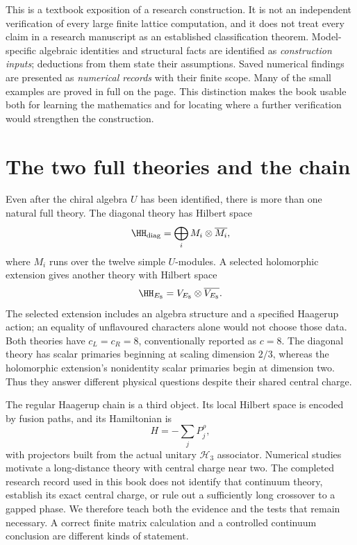 This is a textbook exposition of a research construction. It is not an
independent verification of every large finite lattice computation,
and it does not treat every claim in a research manuscript as an
established classification theorem. Model-specific algebraic identities
and structural facts are identified as \emph{construction inputs};
deductions from them state their assumptions. Saved numerical findings
are presented as \emph{numerical records} with their finite scope.
Many of the small examples are proved
in full on the page. This distinction makes the book usable both for
learning the mathematics and for locating where a further verification
would strengthen the construction.

\section*{The two full theories and the chain}

Even after the chiral algebra $U$ has been identified, there is more
than one natural full theory. The diagonal theory has Hilbert space
\[
 \HH_{\rm diag}=\bigoplus_i M_i\otimes\overline{M_i},
\]
where $M_i$ runs over the twelve simple $U$-modules. A selected
holomorphic extension gives another theory with Hilbert space
\[
 \HH_{E_8}=V_{E_8}\otimes\overline{V_{E_8}}.
\]
The selected extension includes an algebra structure and a specified
Haagerup action; an equality of unflavoured characters alone would
not choose those data. Both theories have $c_L=c_R=8$, conventionally
reported as $c=8$. The diagonal theory has scalar primaries beginning
at scaling dimension $2/3$, whereas the holomorphic extension's
nonidentity scalar primaries begin at dimension two. Thus they answer
different physical questions despite their shared central charge.

The regular Haagerup chain is a third object. Its local Hilbert space
is encoded by fusion paths, and its Hamiltonian is
\[
 H=-\sum_jP_j^\rho,
\]
with projectors built from the actual unitary $\mathcal H_3$
associator. Numerical studies motivate a long-distance theory with
central charge near two. The completed research record used in this
book does not identify that continuum theory, establish its exact
central charge, or rule out a sufficiently long crossover to a gapped
phase. We therefore teach both the evidence and the tests that remain
necessary. A correct finite matrix calculation and a controlled
continuum conclusion are different kinds of statement.

